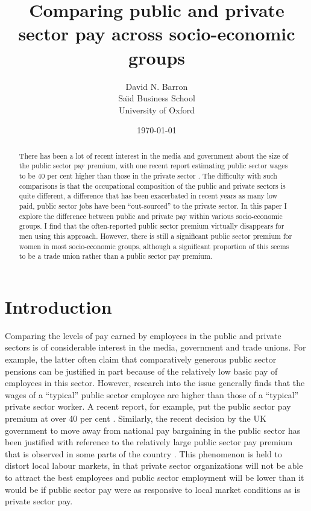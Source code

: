 \documentclass[a4paper,11pt,titlepage]{article}
\title{Comparing public and private sector pay across socio-economic groups}
\author{David N. Barron\\ Sa\"{\i}d Business School\\ University of Oxford}
\date{\today}
\let\cite\citep
\begin{document}
\maketitle

\thispagestyle{fancy}

\begin{abstract}
    There has been a lot of recent interest in the media and government about the size of the public sector pay premium, with one recent report estimating public sector wages to be 40 per cent higher than those in the private sector \citep{Holmes2011}. The difficulty with such comparisons is that the occupational composition of the public and private sectors is quite different, a difference that has been exacerbated in recent years as many low paid, public sector jobs have been ``out-sourced'' to the private sector.  In this paper I explore the difference between public and private pay within various socio-economic groups. I find that the often-reported public sector premium virtually disappears for men using this approach.  However, there is still a significant public sector premium for women in most socio-economic groups, although a significant proportion of this seems to be a trade union rather than a public sector pay premium.
\end{abstract}

\section{Introduction}
Comparing the levels of pay earned by employees in the public and private sectors is of considerable interest in the media, government and trade unions.  For example, the latter often claim that comparatively generous public sector pensions can be justified in part because of the relatively low basic pay of employees in this sector.  However, research into the issue generally finds that the wages of a ``typical'' public sector employee are higher than those of a ``typical'' private sector worker.  A recent report, for example, put the public sector pay premium at over 40 per cent \citep{Holmes2011}.  Similarly, the recent decision by the UK government to move away from national pay bargaining in the public sector has been justified with reference to the relatively large public sector pay premium that is observed in some parts of the country \cite{OME2012} . This phenomenon is held to distort local labour markets, in that private sector organizations will not be able to attract the best employees and public sector employment will be lower than it would be if public sector pay were as responsive to local market conditions as is private sector pay.
\end{document}
